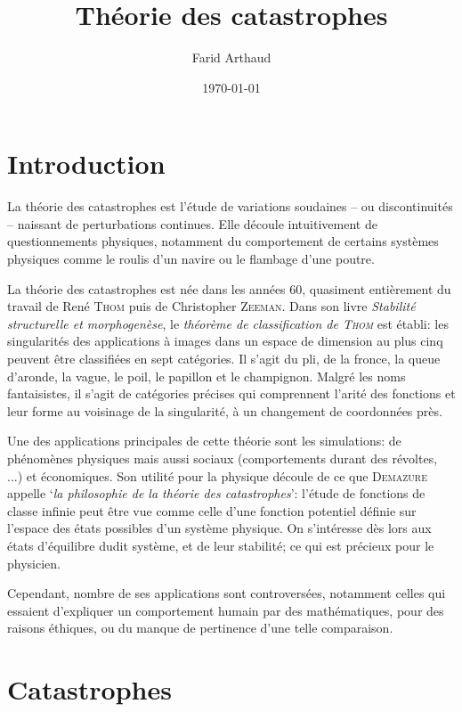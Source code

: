 \documentclass{article}
\theoremstyle{definition}
\begin{document}
%

\setcounter{page}{1}

\title{Théorie des catastrophes}
\author{Farid Arthaud}
\date{\today}
\maketitle

\section{Introduction}

La théorie des catastrophes est l'étude de variations soudaines -- ou discontinuités -- naissant de perturbations continues. Elle découle intuitivement de questionnements physiques, notamment du comportement de certains systèmes physiques comme le roulis d'un navire ou le flambage d'une poutre.

La théorie des catastrophes est née dans les années 60, quasiment entièrement du travail de René \textsc{Thom} puis de Christopher \textsc{Zeeman}.
Dans son livre \textit{Stabilité structurelle et morphogenèse}, le \textit{théorème de classification de \textsc{Thom}} est établi: les singularités des applications à images dans un espace de dimension au plus cinq peuvent être classifiées en sept catégories.
Il s'agit du pli, de la fronce, la queue d'aronde, la vague, le poil, le papillon et le champignon.
Malgré les noms fantaisistes, il s'agit de catégories précises qui comprennent l'arité des fonctions et leur forme au voisinage de la singularité, à un changement de coordonnées près.

Une des applications principales de cette théorie sont les simulations: de phénomènes physiques mais aussi sociaux (comportements durant des révoltes, ...) et économiques.
Son utilité pour la physique découle de ce que \textsc{Demazure} appelle `\textit{la philosophie de la théorie des catastrophes}': l'étude de fonctions de classe infinie peut être vue comme celle d'une fonction potentiel définie sur l'espace des états possibles d'un système physique.
On s'intéresse dès lors aux états d'équilibre dudit système, et de leur stabilité; ce qui est précieux pour le physicien.

Cependant, nombre de ses applications sont controversées, notamment celles qui essaient d'expliquer un comportement humain par des mathématiques, pour des raisons éthiques, ou du manque de pertinence d'une telle comparaison.

\section{Catastrophes}
\end{document}
